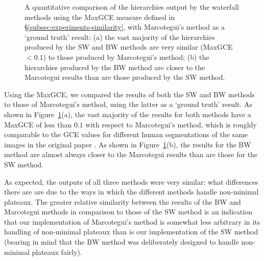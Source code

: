 \documentclass[preprint,a4paper]{elsarticle}
\newenvironment{stusubfig}[1]
{
	\begin{figure}[#1]
	\begin{center}
}
{
	\end{center}
	\end{figure}
}
\begin{document}
\begin{stusubfig}{!t}
	\hspace{4mm}%
\caption{A quantitative comparison of the hierarchies output by the waterfall methods using the MaxGCE measure defined in \S\ref{subsec:experiments-similarity}, with Marcotegui's method as a `ground truth' result: (a) the vast majority of the hierarchies produced by the SW and BW methods are very similar (MaxGCE $< 0.1$) to those produced by Marcotegui's method; (b) the hierarchies produced by the BW method are closer to the Marcotegui results than are those produced by the SW method.}
\label{fig:quantitative-comparison}
\end{stusubfig}

Using the MaxGCE, we compared the results of both the SW and BW methods to those of Marcotegui's method, using the latter as a `ground truth' result. As shown in Figure~\ref{fig:quantitative-comparison}(a), the vast majority of the results for both methods have a MaxGCE of less than $0.1$ with respect to Marcotegui's method, which is roughly comparable to the GCE values for different human segmentations of the same images in the original paper \cite{martin01}. As shown in Figure~\ref{fig:quantitative-comparison}(b), the results for the BW method are almost always closer to the Marcotegui results than are those for the SW method.

As expected, the outputs of all three methods were very similar: what differences there are are due to the ways in which the different methods handle non-minimal plateaux. The greater relative similarity between the results of the BW and Marcotegui methods in comparison to those of the SW method is an indication that our implementation of Marcotegui's method is somewhat less arbitrary in its handling of non-minimal plateaux than is our implementation of the SW method (bearing in mind that the BW method was deliberately designed to handle non-minimal plateaux fairly).
\end{document}

